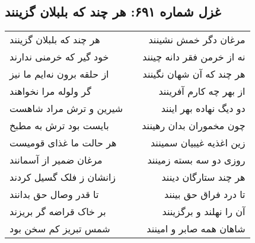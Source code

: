 \begin{center}
\section*{غزل شماره ۶۹۱: هر چند که بلبلان گزینند}
\label{sec:0691}
\begin{longtable}{l p{0.5cm} r}
هر چند که بلبلان گزینند
&&
مرغان دگر خمش نشینند
\\
خود گیر که خرمنی ندارند
&&
نه از خرمن فقر دانه چینند
\\
از حلقه برون نه‌ایم ما نیز
&&
هر چند که آن شهان نگینند
\\
گر ولوله مرا نخواهند
&&
از بهر چه کارم آفرینند
\\
شیرین و ترش مراد شاهست
&&
دو دیگ نهاده بهر اینند
\\
بایست بود ترش به مطبخ
&&
چون مخموران بدان رهینند
\\
هر حالت ما غذای قومیست
&&
زین اغذیه غیبیان سمینند
\\
مرغان ضمیر از آسمانند
&&
روزی دو سه بسته زمینند
\\
زانشان ز فلک گسیل کردند
&&
هر چند ستارگان دینند
\\
تا قدر وصال حق بدانند
&&
تا درد فراق حق بینند
\\
بر خاک قراضه گر بریزند
&&
آن را نهلند و برگزینند
\\
شمس تبریز کم سخن بود
&&
شاهان همه صابر و امینند
\\
\end{longtable}
\end{center}
